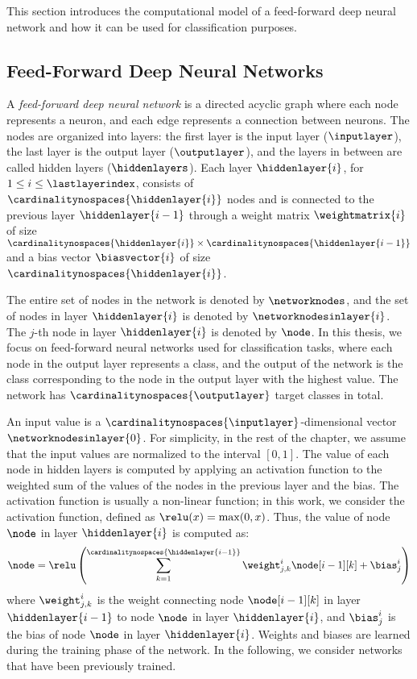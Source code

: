 This section introduces the computational model of a feed-forward deep neural network and how it can be used for classification purposes.
\subsection{Feed-Forward Deep Neural Networks}

A \emph{feed-forward deep neural network} is a directed acyclic graph where each node represents a neuron, and each edge represents a connection between neurons. The nodes are organized into layers: the first layer is the input layer ($\inputlayer$), the last layer is the output layer ($\outputlayer$), and the layers in between are called hidden layers ($\hiddenlayers$). Each layer $\hiddenlayer{i}$, for $1 \le i \le \lastlayerindex$, consists of $\cardinalitynospaces{\hiddenlayer{i}}$ nodes and is connected to the previous layer $\hiddenlayer{i-1}$ through a weight matrix $\weightmatrix{i}$ of size $\cardinalitynospaces{\hiddenlayer{i}}\times\cardinalitynospaces{\hiddenlayer{i-1}}$ and a bias vector $\biasvector{i}$ of size $\cardinalitynospaces{\hiddenlayer{i}}$.

The entire set of nodes in the network is denoted by $\networknodes$, and the set of nodes in layer $\hiddenlayer{i}$ is denoted by $\networknodesinlayer{i}$. The $j$-th node in layer $\hiddenlayer{i}$ is denoted by $\node$. In this thesis, we focus on feed-forward neural networks used for classification tasks, where each node in the output layer represents a class, and the output of the network is the class corresponding to the node in the output layer with the highest value. The network has $\cardinalitynospaces{\outputlayer}$ target classes in total.

An input value is a $\cardinalitynospaces{\inputlayer}$-dimensional vector $\networknodesinlayer{0}$. For simplicity, in the rest of the chapter, we assume that the input values are normalized to the interval $[0,1]$. The value of each node in hidden layers is computed by applying an activation function to the weighted sum of the values of the nodes in the previous layer and the bias. The activation function is usually a non-linear function; in this work, we consider the \relu{} activation function, defined as $\relu(x) = \max(0, x)$. Thus, the value of node $\node$ in layer $\hiddenlayer{i}$ is computed as:
\begin{align*}
\node = \relu\left(
\sum_{k=1}^{\cardinalitynospaces{\hiddenlayer{i-1}}} \weight_{j,k}^{i} \node[i-1][k] + \bias_{j}^{i}
\right)
\end{align*}
where $\weight_{j,k}^{i}$ is the weight connecting node $\node[i-1][k]$ in layer $\hiddenlayer{i-1}$ to node $\node$ in layer $\hiddenlayer{i}$, and $\bias_{j}^{i}$ is the bias of node $\node$ in layer $\hiddenlayer{i}$. Weights and biases are learned during the training phase of the network. In the following, we consider networks that have been previously trained.


